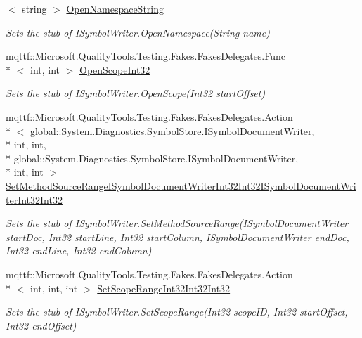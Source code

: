 \begin{DoxyCompactItemize}
$<$ string $>$ \hyperlink{class_system_1_1_diagnostics_1_1_symbol_store_1_1_fakes_1_1_stub_i_symbol_writer_a026bdd07e4ed6804a5dc6d9ebf2347cb}{Open\-Namespace\-String}
\begin{DoxyCompactList}\small\item\em Sets the stub of I\-Symbol\-Writer.\-Open\-Namespace(\-String name)\end{DoxyCompactList}\item 
mqttf\-::\-Microsoft.\-Quality\-Tools.\-Testing.\-Fakes.\-Fakes\-Delegates.\-Func\\*
$<$ int, int $>$ \hyperlink{class_system_1_1_diagnostics_1_1_symbol_store_1_1_fakes_1_1_stub_i_symbol_writer_ae9c1e9026003773a9ae9d8b18674fab4}{Open\-Scope\-Int32}
\begin{DoxyCompactList}\small\item\em Sets the stub of I\-Symbol\-Writer.\-Open\-Scope(\-Int32 start\-Offset)\end{DoxyCompactList}\item 
mqttf\-::\-Microsoft.\-Quality\-Tools.\-Testing.\-Fakes.\-Fakes\-Delegates.\-Action\\*
$<$ global\-::\-System.\-Diagnostics.\-Symbol\-Store.\-I\-Symbol\-Document\-Writer, \\*
int, int, \\*
global\-::\-System.\-Diagnostics.\-Symbol\-Store.\-I\-Symbol\-Document\-Writer, \\*
int, int $>$ \hyperlink{class_system_1_1_diagnostics_1_1_symbol_store_1_1_fakes_1_1_stub_i_symbol_writer_a45f98c193812e6401fb350b7889da754}{Set\-Method\-Source\-Range\-I\-Symbol\-Document\-Writer\-Int32\-Int32\-I\-Symbol\-Document\-Writer\-Int32\-Int32}
\begin{DoxyCompactList}\small\item\em Sets the stub of I\-Symbol\-Writer.\-Set\-Method\-Source\-Range(\-I\-Symbol\-Document\-Writer start\-Doc, Int32 start\-Line, Int32 start\-Column, I\-Symbol\-Document\-Writer end\-Doc, Int32 end\-Line, Int32 end\-Column)\end{DoxyCompactList}\item 
mqttf\-::\-Microsoft.\-Quality\-Tools.\-Testing.\-Fakes.\-Fakes\-Delegates.\-Action\\*
$<$ int, int, int $>$ \hyperlink{class_system_1_1_diagnostics_1_1_symbol_store_1_1_fakes_1_1_stub_i_symbol_writer_aac63970832168a1dd7e585a712955d52}{Set\-Scope\-Range\-Int32\-Int32\-Int32}
\begin{DoxyCompactList}\small\item\em Sets the stub of I\-Symbol\-Writer.\-Set\-Scope\-Range(\-Int32 scope\-I\-D, Int32 start\-Offset, Int32 end\-Offset)\end{DoxyCompactList}\item 

\end{DoxyCompactItemize}
